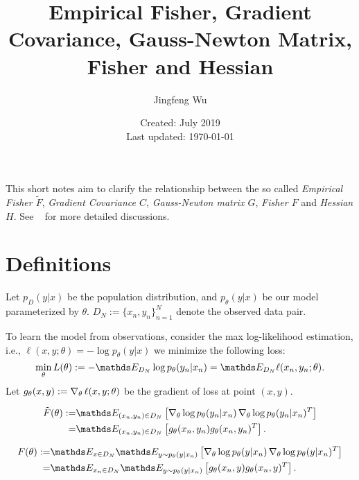 \documentclass{article}
\title{Empirical Fisher, Gradient Covariance, Gauss-Newton Matrix, Fisher and Hessian}
\author{Jingfeng Wu}
\date{Created: July 2019\\ Last updated: \today}
\begin{document}
\maketitle

This short notes aim to clarify the relationship between the so called \emph{Empirical Fisher $\tilde{F}$}, \emph{Gradient Covariance $C$}, \emph{Gauss-Newton matrix $G$}, \emph{Fisher $F$} and \emph{Hessian $H$}. See ~\cite{kunstner2019limitations,martens2014new,thomas2019information} for more detailed discussions.

\section{Definitions}
Let $p_D(y|x)$ be the population distribution, and $p_{\theta}(y|x)$ be our model parameterized by $\theta$.
$D_N:=\{x_n,y_n\}_{n=1}^N$ denote the observed data pair.

To learn the model from observations, consider the max log-likelihood estimation, i.e., $\ell(x,y;\theta)=- \log p_{\theta}(y|x)$
we minimize the following loss:
\begin{equation*}
    \min_{\theta} L(\theta) := - \Ebb_{D_N}\log p_{\theta}(y_n|x_n) = \Ebb_{D_N} \ell(x_n,y_n;\theta).
\end{equation*}
Let $g_{\theta}(x,y):=\operatorname{\nabla}_{\theta}\ell(x,y;\theta)$ be the gradient of loss at point $(x,y)$.

\begin{defi}
\begin{equation*}
\begin{aligned}
    \tilde{F}(\theta) :=& \Ebb_{(x_n,y_n)\in D_N}\left[ \grad_{\theta} \log p_{\theta}(y_n|x_n) \grad_{\theta} \log p_{\theta}(y_n|x_n)^T \right] \\
    =& \Ebb_{(x_n,y_n)\in D_N}\left[ g_{\theta}(x_n,y_n)g_{\theta}(x_n,y_n)^T \right].
\end{aligned}
\end{equation*}
\end{defi}

\begin{defi}[Fisher]
\begin{equation*}
    \begin{aligned}
        F(\theta) :=& \Ebb_{x\in D_N} \Ebb_{y\sim p_{\theta}(y|x_n)}\left[ \grad_{\theta} \log p_{\theta}(y|x_n) \grad_{\theta} \log p_{\theta}(y|x_n)^T \right] \\
    =& \Ebb_{x_n\in D_N} \Ebb_{y\sim p_{\theta}(y|x_n)}\left[ g_{\theta}(x_n,y)g_{\theta}(x_n,y)^T \right].
    \end{aligned}
\end{equation*}
\end{defi}
\end{document}
